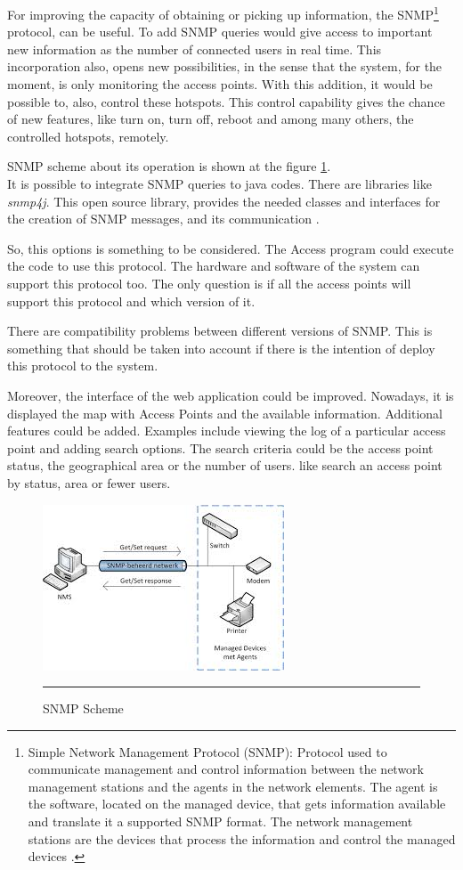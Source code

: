 \documentclass[12pt, a4paper,twoside]{tesi_upf}
\begin{document}
For improving the capacity of obtaining or picking up information, the SNMP\footnote{Simple Network Management Protocol (SNMP): Protocol used to communicate management and control information between the network management stations and the agents in the network elements. The agent is the software, located on the managed device, that gets information available and translate it a supported SNMP format. The network management stations are the devices that process the information and control the managed devices \cite{SNMP}.} protocol, can be useful. To add SNMP queries would give access to important new information as the number of connected users in real time. This incorporation also, opens new possibilities, in the sense that the system, for the moment, is only monitoring the access points. With this addition, it would be possible to, also, control these hotspots. This control capability gives the chance of new features, like turn on, turn off, reboot and among many others, the controlled hotspots, remotely.

SNMP scheme about its operation is shown at the figure \ref{fig:snmp}.\\

It is possible to integrate SNMP queries to java codes. There are libraries like \textit{snmp4j}. This open source library, provides the needed classes and interfaces for the creation of SNMP messages, and its communication \cite{snmplibrary}.

So, this options is something to be considered. The Access program could execute the code to use this protocol. The hardware and software of the system can support this protocol too. The only question is if all the access points will support this protocol and which version of it. 

There are compatibility problems between different versions of SNMP. This is something that should be taken into account if there is the intention of deploy this protocol to the system.

Moreover, the interface of the web application could be improved. Nowadays, it is displayed the map with Access Points and the available information. Additional features could be added. Examples include viewing the log of a particular access point and adding search options. The search criteria could be the access point status, the geographical area or the number of users. like search an access point by status, area or fewer users.

     \begin{figure}[htbp]
          \centering
              \includegraphics[scale=1]{./figures/snmp.png}
              \rule{32em}{0.5pt}
            \caption[SNMP Scheme]{SNMP Scheme}
            \label{fig:snmp}
        \end{figure}
\end{document}
